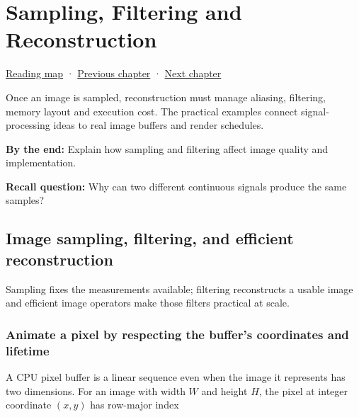 \chapter{Sampling, Filtering and Reconstruction}\label{03-visual-computing-i-ch004-sampling-filtering-and-reconstruction}\hypertarget{03-visual-computing-i-ch004}{}\label{stagechapter:03-visual-computing-i-ch004}

\hypertarget{03-visual-computing-i-ch004-sampling-filtering-and-reconstruction}{}

\hyperref[volume-reading-map]{Reading map} · \hyperref[03-visual-computing-i-ch003-lens-optics-and-image-formation]{Previous chapter} · \hyperref[03-visual-computing-i-ch013]{Next chapter}

Once an image is sampled, reconstruction must manage aliasing, filtering, memory layout and execution cost. The practical examples connect signal-processing ideas to real image buffers and render schedules.

\textbf{By the end:} Explain how sampling and filtering affect image quality and implementation.

\textbf{Recall question:} Why can two different continuous signals produce the same samples?

\section{Image sampling, filtering, and efficient reconstruction}\label{03-visual-computing-i-ch004-image-sampling-filtering-and-efficient-reconstruction}

\hypertarget{03-visual-computing-i-ch004-image-sampling-filtering-and-efficient-reconstruction}{}

Sampling fixes the measurements available; filtering reconstructs a usable image and efficient image operators make those filters practical at scale.

\subsection{Animate a pixel by respecting the buffer's coordinates and lifetime}\label{03-visual-computing-i-ch004-animate-a-pixel-by-respecting-the-buffers-coordinates-and-lifetime}

\hypertarget{03-visual-computing-i-ch004-animate-a-pixel-by-respecting-the-buffers-coordinates-and-lifetime}{}

A CPU pixel buffer is a linear sequence even when the image it represents has two dimensions. For an image with width \(W\) and height \(H\), the pixel at integer coordinate \((x,y)\) has row-major index

